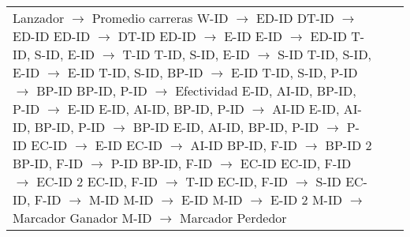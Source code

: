 \documentclass{report}
\begin{document}
\begin{tabularx}{\textwidth}{|X|X|X|}
        Lanzador $\rightarrow$ Promedio carreras \newline 
        W-ID $\rightarrow$ ED-ID \newline 
        DT-ID $\rightarrow$ ED-ID \newline 
        ED-ID $\rightarrow$ DT-ID \newline 
        ED-ID $\rightarrow$ E-ID \newline 
        E-ID $\rightarrow$ ED-ID \newline 
        T-ID, S-ID, E-ID $\rightarrow$ T-ID \newline 
        T-ID, S-ID, E-ID $\rightarrow$ S-ID \newline 
        T-ID, S-ID, E-ID $\rightarrow$ E-ID \newline 
        T-ID, S-ID, BP-ID $\rightarrow$ E-ID \newline 
        T-ID, S-ID, P-ID $\rightarrow$ BP-ID \newline 
        BP-ID, P-ID $\rightarrow$ Efectividad \newline 
        E-ID, AI-ID, BP-ID, P-ID $\rightarrow$ E-ID \newline 
        E-ID, AI-ID, BP-ID, P-ID $\rightarrow$ AI-ID \newline 
        E-ID, AI-ID, BP-ID, P-ID $\rightarrow$ BP-ID \newline 
        E-ID, AI-ID, BP-ID, P-ID $\rightarrow$ P-ID \newline 
        EC-ID $\rightarrow$ E-ID \newline 
        EC-ID $\rightarrow$ AI-ID \newline 
        BP-ID, F-ID $\rightarrow$ BP-ID 2 \newline 
        BP-ID, F-ID $\rightarrow$ P-ID \newline 
        BP-ID, F-ID $\rightarrow$ EC-ID \newline 
        EC-ID, F-ID $\rightarrow$ EC-ID 2 \newline 
        EC-ID, F-ID $\rightarrow$ T-ID \newline 
        EC-ID, F-ID $\rightarrow$ S-ID \newline 
        EC-ID, F-ID $\rightarrow$ M-ID \newline 
        M-ID $\rightarrow$ E-ID \newline 
        M-ID $\rightarrow$ E-ID 2 \newline 
        M-ID $\rightarrow$ Marcador Ganador \newline 
        M-ID $\rightarrow$ Marcador Perdedor & 


\end{tabularx}
\end{document}
